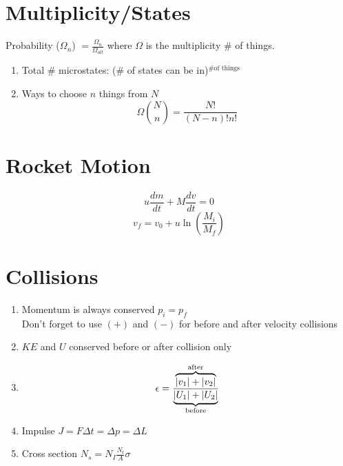 \documentclass[10pt,a4paper]{article}
\begin{document}
\section{Multiplicity/States} %
\label{sec:multiplicity_states}
Probability ($\Omega_n$) $=\frac{\Omega_n}{\Omega_{all}}$ where $\Omega$ is the multiplicity \# of things.
\begin{enumerate}
    \item Total \# microstates: (\# of states can be in)$^{\textrm{\# of things}}$ 
    \item Ways to choose $n$ things from $N$
    \begin{equation}
        \Omega \binom{N}{n} = \frac{N!}{(N-n)!n!}
    \end{equation}
\end{enumerate}

\section{Rocket Motion} %
\label{sec:rocket_motion}
\begin{equation}
    u \frac{dm}{dt} + M \frac{dv}{dt} = 0
\end{equation}
\begin{equation}
v_f = v_0 + u \ln \left( \frac{M_i}{M_f} \right)
\end{equation}

\section{Collisions} %
\label{sec:collisions}
\begin{enumerate}
    \item Momentum is always conserved $p_i = p_f$\\
    Don't forget to use $(+)$ and $(-)$ for before and after velocity collisions 
    \item $KE$ and $U$ conserved before or after collision only
    \item \begin{equation}
        \epsilon = \frac{\overbrace{|v_1| + |v_2|}^{\mathclap{\textrm{after}}}}{\underbrace{|U_1| + |U_2|}_{\mathclap{\textrm{before}}}}
    \end{equation} 
    \item Impulse $J = F \Delta t = \Delta p = \Delta L$
    \item Cross section $N_s = N_I \frac{N_t}{A} \sigma$
\end{enumerate}
\end{document}
